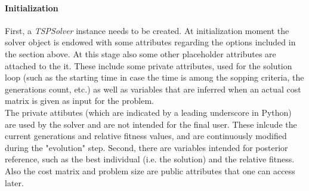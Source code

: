 \documentclass{article}
\begin{document}
\paragraph*{Initialization} First, a \textit{TSPSolver} instance needs to be created. At initialization moment the solver object is endowed with some attributes regarding the options included in the section above. At this stage also some other placeholder attributes are attached to the it. These include some private attributes, used for the solution loop (such as the starting time in case the time is among the sopping criteria, the generations count, etc.) as well as variables that are inferred when an actual cost matrix is given as input for the problem. \\
The private attibutes (which are indicated by a leading underscore in Python) are used by the solver and are not intended for the final user. These inlcude the current generations and relative fitness values, and are continuously modified during the "evolution" step. Second, there are variables intended for posterior reference, such as the best individual (i.e. the solution) and the relative fitness. Also the cost matrix and problem size are public attributes that one can access later. 
\end{document}
